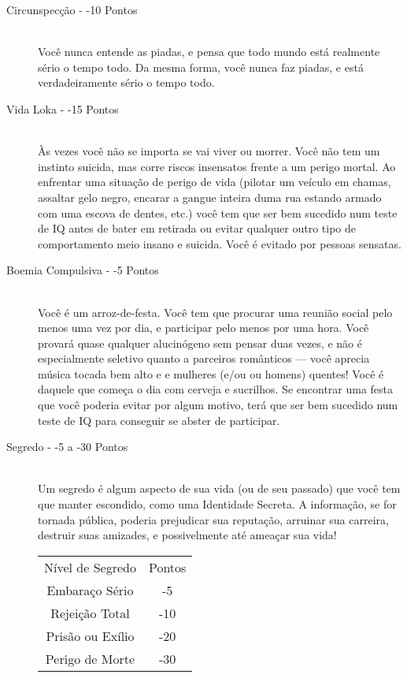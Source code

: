 \documentclass[a4paper]{article}
\begin{document}
\begin{description}
    \item[Circunspecção - -10 Pontos] \hfill \\ Você nunca entende as piadas, e pensa que todo mundo está
realmente sério o tempo todo. Da mesma forma, você nunca faz
piadas, e está verdadeiramente sério o tempo todo.

    \item[Vida Loka - -15 Pontos] \hfill \\ Às vezes você não se importa se vai viver ou morrer. Você
não tem um instinto suicida, mas corre riscos insensatos frente a
um perigo mortal. Ao enfrentar uma situação de perigo de vida (pilotar um veículo em chamas, assaltar gelo negro, encarar a
gangue inteira duma rua estando armado com uma escova de
dentes, etc.) você tem que ser bem sucedido num teste de IQ antes
de bater em retirada ou evitar qualquer
outro tipo de comportamento meio insano e suicida. Você é evitado por pessoas sensatas.

    \item[Boemia Compulsiva - -5 Pontos] \hfill \\ Você é um arroz-de-festa. Você tem que procurar uma reunião
social pelo menos uma vez por dia, e participar pelo menos por uma
hora. Você provará quase qualquer alucinógeno sem pensar duas
vezes, e não é especialmente seletivo quanto a parceiros românticos
— você aprecia música tocada bem alto e e mulheres (e/ou ou
homens) quentes! Você é daquele que começa o dia com cerveja e
sucrilhos. Se encontrar uma festa que você poderia evitar por algum
motivo, terá que ser bem sucedido num teste de IQ para conseguir se
abster de participar.

    \item[Segredo - -5 a -30 Pontos] \hfill \\ Um segredo é algum aspecto de sua vida (ou de seu passado) que
você tem que manter escondido, como uma Identidade Secreta. A informação, se for tornada
pública, poderia prejudicar sua reputação, arruinar sua carreira,
destruir suas amizades, e possivelmente até ameaçar sua vida!

\begin{table}[h]
 \centering
 {\renewcommand\arraystretch{1.25}
 \begin{tabular}{ l l }
  \cline{1-1}\cline{2-2}  
    \multicolumn{1}{|c|}{Nível de Segredo \centering } &
    \multicolumn{1}{c|}{Pontos \centering }
  \\  
  \cline{1-1}\cline{2-2}  
    \multicolumn{1}{|c|}{Embaraço Sério \centering } &
    \multicolumn{1}{c|}{-5 \centering }
  \\  
  \cline{1-1}\cline{2-2}  
    \multicolumn{1}{|c|}{Rejeição Total \centering } &
    \multicolumn{1}{c|}{-10 \centering }
  \\  
  \cline{1-1}\cline{2-2}  
    \multicolumn{1}{|c|}{Prisão ou Exílio \centering } &
    \multicolumn{1}{c|}{-20 \centering }
  \\  
  \cline{1-1}\cline{2-2}  
    \multicolumn{1}{|c|}{Perigo de Morte \centering } &
    \multicolumn{1}{c|}{-30 \centering }
  \\  
  \hline


\end{tabular}}
\end{table}
\end{description}
\end{document}
